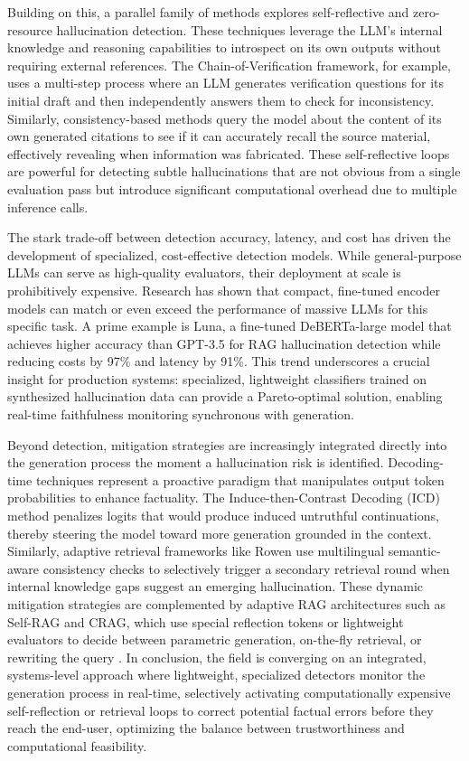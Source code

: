 \documentclass[11pt,a4paper]{article}
\begin{document}
Building on this, a parallel family of methods explores self-reflective and zero-resource hallucination detection. These techniques leverage the LLM's internal knowledge and reasoning capabilities to introspect on its own outputs without requiring external references. The Chain-of-Verification framework, for example, uses a multi-step process where an LLM generates verification questions for its initial draft and then independently answers them to check for inconsistency. Similarly, consistency-based methods query the model about the content of its own generated citations to see if it can accurately recall the source material, effectively revealing when information was fabricated. These self-reflective loops are powerful for detecting subtle hallucinations that are not obvious from a single evaluation pass but introduce significant computational overhead due to multiple inference calls.

The stark trade-off between detection accuracy, latency, and cost has driven the development of specialized, cost-effective detection models. While general-purpose LLMs can serve as high-quality evaluators, their deployment at scale is prohibitively expensive. Research has shown that compact, fine-tuned encoder models can match or even exceed the performance of massive LLMs for this specific task. A prime example is Luna, a fine-tuned DeBERTa-large model that achieves higher accuracy than GPT-3.5 for RAG hallucination detection while reducing costs by 97\% and latency by 91\%. This trend underscores a crucial insight for production systems: specialized, lightweight classifiers trained on synthesized hallucination data can provide a Pareto-optimal solution, enabling real-time faithfulness monitoring synchronous with generation.

Beyond detection, mitigation strategies are increasingly integrated directly into the generation process the moment a hallucination risk is identified. Decoding-time techniques represent a proactive paradigm that manipulates output token probabilities to enhance factuality. The Induce-then-Contrast Decoding (ICD) method penalizes logits that would produce induced untruthful continuations, thereby steering the model toward more generation grounded in the context. Similarly, adaptive retrieval frameworks like Rowen use multilingual semantic-aware consistency checks to selectively trigger a secondary retrieval round when internal knowledge gaps suggest an emerging hallucination. These dynamic mitigation strategies are complemented by adaptive RAG architectures such as Self-RAG and CRAG, which use special reflection tokens or lightweight evaluators to decide between parametric generation, on-the-fly retrieval, or rewriting the query \cite{arxiv:2401.15884v2}. In conclusion, the field is converging on an integrated, systems-level approach where lightweight, specialized detectors monitor the generation process in real-time, selectively activating computationally expensive self-reflection or retrieval loops to correct potential factual errors before they reach the end-user, optimizing the balance between trustworthiness and computational feasibility.
\end{document}
